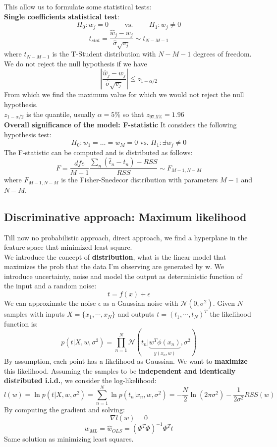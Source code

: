 \begin{itemize}
        This allow us to formulate some statistical tests:\\
        \textbf{Single coefficients statistical test}:
        $$H_0: w_j = 0 \qquad \text{ vs. } \qquad H_1: w_j \neq 0$$
        \begin{equation*}
        t_{stat} = \frac{\hat{w}_j - w_j}{\hat{\sigma} \sqrt{v_j}} \sim t_{N - M - 1}
        \end{equation*}
        where $t_{N - M - 1}$ is the T-Student distribution with $N-M-1$ degrees of freedom.\\
        We do not reject the null hypothesis if we have
        $$\left|\frac{\hat{w}_j-w_j}{\hat{\sigma}\sqrt{v_j}}\right|\leq z_{1-\alpha/2}$$
        From which we find the maximum value for which we would not reject the null hypothesis.\\
        $z_{1-\alpha/2}$ is the quantile, usually $\alpha=5\%$ so that $z_{97.5\%}=1.96$\\
        \textbf{Overall significance of the model: F-statistic}
        It considers the following hypothesis test:
        $$H_0: w_1 = \dots = w_M = 0 \text{ vs. }  H_1: \exists w_j \neq 0$$
        The F-statistic can be computed and is distributed as follows:
        $$ F = \frac{dfe}{M - 1}\frac{\sum_n (\hat{t}_n-t_n)- RSS}{RSS} \sim F_{M-1, N-M} $$
        where $F_{M-1, N-M}$ is the Fisher-Snedecor distribution with parameters $M-1$ and $N-M$.
    \end{itemize}

\subsection{Discriminative approach: Maximum likelihood}
    Till now no probabilistic approach, direct approach, we find a hyperplane in the feature space that minimized least square.\\
    We introduce the concept of \textbf{distribution}, what is the linear model that maximizes the prob that the data I'm observing are generated by w. We introduce uncertainty, noise and model the output as deterministic function of the input and a random noise:
    $$t=f(x)+\epsilon$$
    We can approximate the noise $\epsilon$ as a Gaussian noise with $\mathcal{N}(0,\sigma^2)$. Given $N$ samples with inputs $X=\{x_1,\cdots,x_N\}$ and outputs $t=(t_1,\cdots,t_N)^T$ the likelihood function is:
    $$p(t|X,w,\sigma^2)=\prod_{n=1}^N\mathcal{N}(t_n|\underset{y(x_n,w)}{\underbrace{w^T\phi(x_n)}},\sigma^2)$$
    By assumption, each point has a likelihood as Gaussian. We want to \textbf{maximize} this likelihood. Assuming the samples to be \textbf{independent and identically distributed i.i.d.}, we consider the log-likelihood:
    $$l(w)=\ln p(t|X,w,\sigma^2)=\sum_{n=1}^N\ln p(t_n|x_n,w,\sigma^2)=-\frac{N}{2}\ln(2\pi\sigma^2)-\frac{1}{2\sigma^2}RSS(w)$$
    By computing the gradient and solving:
    $$\nabla l(w)=0$$
    $$w_{ML}=\hat{w}_{OLS}=(\Phi^T\Phi)^{-1}\Phi^Tt$$
    Same solution as minimizing least squares.
    
